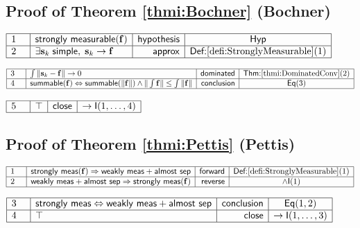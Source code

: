 \documentclass[11pt,reqno]{amsart}
\begin{document}
	\subsection*{Proof of Theorem \protect\ref{thmi:Bochner} (\textsf{Bochner})}
	\noindent$\begin{array}{|m{0.5cm}|l|r|c|}
	\hline
	1 & \mathsf{strongly\ measurable}(\mathbf{f}) & \mathsf{hypothesis} & \mathsf{Hyp} \\ \hline
	2 & \exists\mathbf{s}_{k}\;\mathsf{simple},\;\mathbf{s}_{k}\to\mathbf{f} & \mathsf{approx} & \textsf{Def:}\ref{defi:StronglyMeasurable}(1) \\ \hline
	\end{array}$
	\par\nointerlineskip\noindent$\begin{array}{|m{0.5cm}|l|r|c|}
	\hline
	3 & \int\|\mathbf{s}_{k}-\mathbf{f}\|\to0 & \mathsf{dominated} & \textsf{Thm:}\ref{thmi:DominatedConv}(2) \\ \hline
	4 & \mathsf{summable}(\mathbf{f})\Leftrightarrow\mathsf{summable}(\|\mathbf{f}\|)\wedge\|\int\mathbf{f}\|\le\int\|\mathbf{f}\| & \mathsf{conclusion} & \mathsf{Eq}(3) \\ \hline
	\end{array}$
	\par\nointerlineskip\noindent$\begin{array}{|m{0.5cm}|l|r|c|}
	\hline
	5 & \top & \mathsf{close} & \to\mathsf{I}(1,\dots,4) \\ \hline
	\end{array}$
	\medskip
	
	\subsection*{Proof of Theorem \protect\ref{thmi:Pettis} (\textsf{Pettis})}
	\noindent$\begin{array}{|m{0.5cm}|l|r|c|}
	\hline
	1 & \mathsf{strongly\ meas}(\mathbf{f})\Rightarrow\mathsf{weakly\ meas}+\mathsf{almost\ sep} & \mathsf{forward} & \textsf{Def:}\ref{defi:StronglyMeasurable}(1) \\ \hline
	2 & \mathsf{weakly\ meas}+\mathsf{almost\ sep}\Rightarrow\mathsf{strongly\ meas}(\mathbf{f}) & \mathsf{reverse} & \wedge\mathsf{I}(1) \\ \hline
	\end{array}$
	\par\nointerlineskip\noindent$\begin{array}{|m{0.5cm}|l|r|c|}
	\hline
	3 & \mathsf{strongly\ meas}\Leftrightarrow\mathsf{weakly\ meas}+\mathsf{almost\ sep} & \mathsf{conclusion} & \mathsf{Eq}(1,2) \\ \hline
	4 & \top & \mathsf{close} & \to\mathsf{I}(1,\dots,3) \\ \hline
	\end{array}$
	\medskip
	
\end{document}
